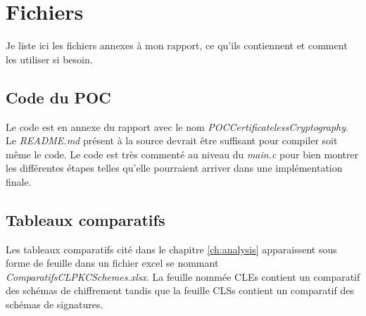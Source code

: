 \chapter{Fichiers}
\label{ch:fichiers}
Je liste ici les fichiers annexes à mon rapport, ce qu'ils contiennent et comment les utiliser si besoin.
\section{Code du POC}
Le code est en annexe du rapport avec le nom \textit{POCCertificatelessCryptography}.
Le \textit{README.md} présent à la source devrait être suffisant pour compiler soit même le code. 
Le code est très commenté au niveau du \textit{main.c} pour bien montrer les différentes étapes telles qu'elle pourraient arriver dans une implémentation finale.
\section{Tableaux comparatifs}
Les tableaux comparatifs cité dans le chapitre \ref{ch:analysis} apparaissent sous forme de feuille dans un fichier excel se nommant \textit{ComparatifsCLPKCSchemes.xlsx}. 
La feuille nommée CLEs contient un comparatif des schémas de chiffrement tandis que la feuille CLSs contient un comparatif des schémas de signatures.